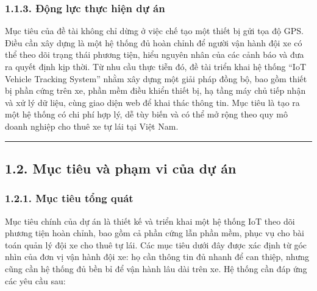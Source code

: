 \documentclass[a4paper]{extarticle}
\begin{document}
\subsubsection{1.1.3. Động lực thực hiện dự
án}\label{113-ux111ux1ed9ng-lux1ef1c-thux1ef1c-hiux1ec7n-dux1ef1-uxe1n}

Mục tiêu của đề tài không chỉ dừng ở việc chế tạo một thiết bị gửi tọa
độ GPS. Điều cần xây dựng là một hệ thống đủ hoàn chỉnh để người vận
hành đội xe có thể theo dõi trạng thái phương tiện, hiểu nguyên nhân của
các cảnh báo và đưa ra quyết định kịp thời. Từ nhu cầu thực tiễn đó, đề
tài triển khai hệ thống ``IoT Vehicle Tracking System'' nhằm xây dựng
một giải pháp đồng bộ, bao gồm thiết bị phần cứng trên xe, phần mềm điều
khiển thiết bị, hạ tầng máy chủ tiếp nhận và xử lý dữ liệu, cùng giao
 diện web để khai thác thông tin. Mục tiêu là tạo ra một hệ thống có chi
phí hợp lý, dễ tùy biến và có thể mở rộng theo quy mô doanh nghiệp cho
thuê xe tự lái tại Việt Nam.

\begin{center}\rule{0.5\linewidth}{0.5pt}\end{center}

\subsection{1.2. Mục tiêu và phạm vi của dự
án}\label{12-mux1ee5c-tiuxeau-vuxe0-phux1ea1m-vi-cux1ee7a-dux1ef1-uxe1n}

\subsubsection{1.2.1. Mục tiêu tổng
quát}\label{121-mux1ee5c-tiuxeau-tux1ed5ng-quuxe1t}

Mục tiêu chính của dự án là thiết kế và triển khai một hệ thống IoT theo
dõi phương tiện hoàn chỉnh, bao gồm cả phần cứng lẫn phần mềm, phục vụ
cho bài toán quản lý đội xe cho thuê tự lái. Các mục tiêu dưới đây được
xác định từ góc nhìn của đơn vị vận hành đội xe: họ cần thông tin đủ
nhanh để can thiệp, nhưng cũng cần hệ thống đủ bền bỉ để vận hành lâu
dài trên xe. Hệ thống cần đáp ứng các yêu cầu sau:
\end{document}

